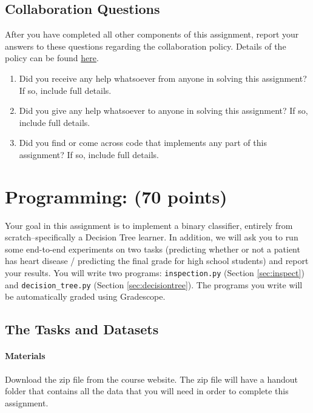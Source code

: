 \documentclass[11pt,addpoints,answers]{exam}
\begin{document}
\begin{questions}
\section{Collaboration Questions}
After you have completed all other components of this assignment, report your answers to these questions regarding the collaboration policy. Details of the policy can be found \href{https://www.cs.cmu.edu/~hchai2/courses/10601/#Syllabus}{here}.
\begin{enumerate}
    \item Did you receive any help whatsoever from anyone in solving this assignment? If so, include full details.
    \item Did you give any help whatsoever to anyone in solving this assignment? If so, include full details.
    \item Did you find or come across code that implements any part of this assignment? If so, include full details.
\end{enumerate}

\begin{your_solution}[height=6cm]

\end{your_solution}
\newpage
\end{questions}

\section{Programming: (70 points)}

Your goal in this assignment is to implement a binary classifier, entirely from scratch--specifically a Decision Tree learner. In addition, we will ask you to run some end-to-end experiments on two tasks (predicting whether or not a patient has heart disease / predicting the final grade for high school students) and report your results.
%
You will write two programs: \texttt{inspection.py} (Section \ref{sec:inspect}) and \texttt{decision\_tree.py} (Section \ref{sec:decisiontree}). The programs you write will be automatically graded using Gradescope.

\subsection{The Tasks and Datasets}
\label{sec:data}

\paragraph{Materials} Download the zip file from the course website. The zip file will have a handout folder that contains all the data that you will need in order to complete this assignment.
\end{document}
